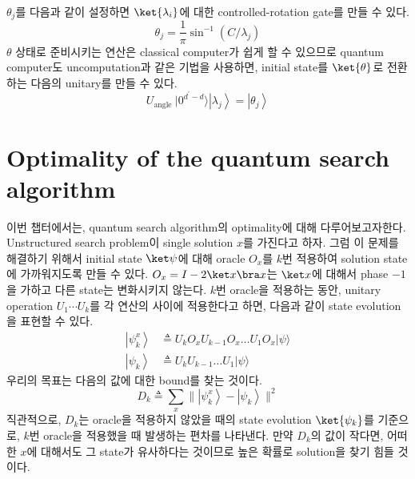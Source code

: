 $\theta_j$를 다음과 같이 설정하면 $\ket{\lambda_i}$에 대한 controlled-rotation gate를 만들 수 있다.
\begin{equation*}
  \theta_j=\frac{1}{\pi} \sin ^{-1}\left(C / \lambda_j\right)
\end{equation*}
$\theta$ 상태로 준비시키는 연산은 classical computer가 쉽게 할 수 있으므로 quantum computer도 uncomputation과 같은 기법을 사용하면, initial state를 $\ket{\theta}$로 전환하는 다음의 unitary를 만들 수 있다.
\begin{equation*}
  U_{\text {angle }}|0^{d^{\prime}-d}\rangle\left|\lambda_j\right\rangle=\left|\theta_j\right\rangle
\end{equation*}


\section{Optimality of the quantum search algorithm}
이번 챕터에서는, quantum search algorithm의 optimality에 대해 다루어보고자한다. 
Unstructured search problem이 single solution $x$를 가진다고 하자. 
그럼 이 문제를 해결하기 위해서 initial state $\ket \psi$에 대해 oracle $O_x$를 $k$번 적용하여 solution state에 가까워지도록 만들 수 있다. 
$O_x = I - 2\ket x \bra x$는 $\ket x$에 대해서 phase $-1$을 가하고 다른 state는 변화시키지 않는다.
\newpage
$k$번 oracle을 적용하는 동안, unitary operation $U_1 \cdots U_k$를 각 연산의 사이에 적용한다고 하면, 다음과 같이 state evolution을 표현할 수 있다. 
\begin{align*}
  \left|\psi_k^x\right\rangle & \triangleq U_k O_x U_{k-1} O_x \ldots U_1 O_x|\psi\rangle \\
  \left|\psi_k\right\rangle & \triangleq U_k U_{k-1} \ldots U_1|\psi\rangle
\end{align*}
우리의 목표는 다음의 값에 대한 bound를 찾는 것이다.
\begin{equation*}
  D_k \triangleq \sum_x \|\left|\psi_k^x\right\rangle-\left|\psi_k\right\rangle \|^2
\end{equation*}
직관적으로, $D_k$는 oracle을 적용하지 않았을 때의 state evolution $\ket{\psi_k}$를 기준으로, $k$번 oracle을 적용했을 때 발생하는 편차를 나타낸다. 만약 $D_k$의 값이 작다면, 어떠한 $x$에 대해서도 그 state가 유사하다는 것이므로 높은 확률로 solution을 찾기 힘들 것이다.

